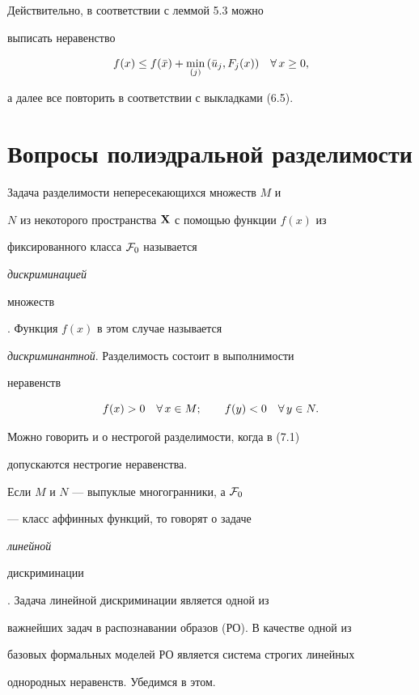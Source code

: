Действительно, в соответствии с леммой 5.3 можно


выписать неравенство


$$


f(x) \le f(\Bar{x}) + \min_{(j)}\, (\Bar{u}_j, F_j(x))\quad


\fo\, x \ge 0,


$$


а далее все повторить в соответствии с выкладками (6.5).





\section{Вопросы полиэдральной разделимости}





Задача разделимости непересекающихся множеств $M$ и


$N$ из некоторого пространства $\bold X$ с помощью функции $f(x)$ из


фиксированного класса ${\cal F}_0$ называется {\it дискриминацией


множеств}. Функция $f(x)$ в этом случае называется


{\it дискриминантной}. Разделимость состоит в выполнимости


неравенств


\begin{equation}


f(x) > 0\quad \fo\, x \in M;\qquad f(y) < 0\quad \fo\, y \in N.


\end{equation}


Можно говорить и о нестрогой разделимости, когда в (7.1)


допускаются нестрогие неравенства.





Если $M$ и $N$ --- выпуклые многогранники, а ${\cal F}_0$


--- класс аффинных функций, то говорят о задаче {\it линейной


дискриминации}. Задача линейной дискриминации является одной из


важнейших задач в распознавании образов (РО). В качестве одной из


базовых формальных моделей РО является система строгих линейных


однородных неравенств. Убедимся в этом.





